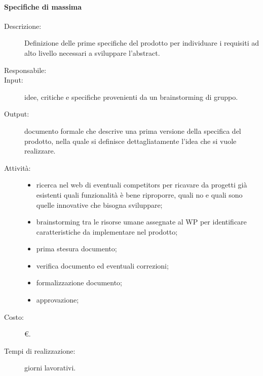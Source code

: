 \paragraph{Specifiche di massima}
\begin{description}
\item[Descrizione:] Definizione delle prime specifiche del prodotto per individuare i requisiti ad alto livello necessari a sviluppare l'abstract.
\item[Responsabile:]
\item[Input:] idee, critiche e specifiche provenienti da un brainstorming di gruppo.
\item[Output:] documento formale che descrive una prima versione della specifica del prodotto, nella quale si definisce dettagliatamente l'idea che si vuole realizzare.
\item[Attività:]
\begin{itemize}
\item ricerca nel web di eventuali competitors per ricavare da progetti già esistenti quali funzionalità è bene riproporre, quali no e quali sono quelle innovative che bisogna sviluppare;
\item brainstorming tra le risorse umane assegnate al WP per identificare caratteristiche da implementare nel prodotto;
\item prima stesura documento;
\item verifica documento ed eventuali correzioni;
\item formalizzazione documento;
\item approvazione;
\end{itemize}
\item[Costo:] \euro{}.
\item[Tempi di realizzazione:] giorni lavorativi.
\end{description}

